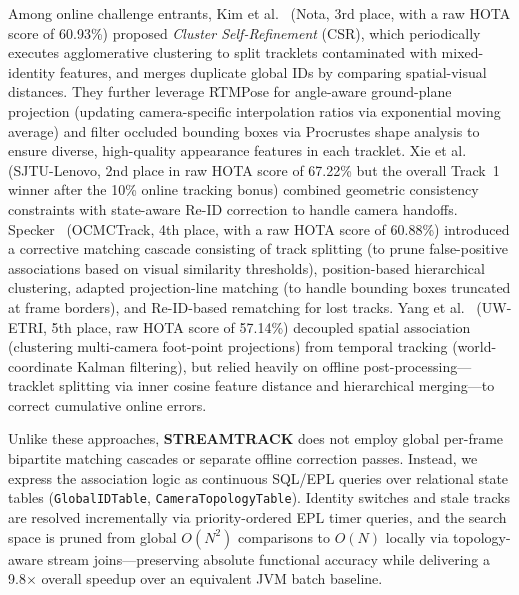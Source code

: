 \documentclass[review]{elsarticle}
\begin{document}
Among online challenge entrants, Kim et al.~\cite{kim2024cluster} (Nota, 3rd place, with a raw HOTA score of 60.93\%) proposed \emph{Cluster Self-Refinement} (CSR), which periodically executes agglomerative clustering to split tracklets contaminated with mixed-identity features, and merges duplicate global IDs by comparing spatial-visual distances. They further leverage RTMPose for angle-aware ground-plane projection (updating camera-specific interpolation ratios via exponential moving average) and filter occluded bounding boxes via Procrustes shape analysis to ensure diverse, high-quality appearance features in each tracklet. Xie et al.~\cite{xie2024robust} (SJTU-Lenovo, 2nd place in raw HOTA score of 67.22\% but the overall Track~1 winner after the 10\% online tracking bonus) combined geometric consistency constraints with state-aware Re-ID correction to handle camera handoffs. Specker~\cite{specker2024ocmctrack} (OCMCTrack, 4th place, with a raw HOTA score of 60.88\%) introduced a corrective matching cascade consisting of track splitting (to prune false-positive associations based on visual similarity thresholds), position-based hierarchical clustering, adapted projection-line matching (to handle bounding boxes truncated at frame borders), and Re-ID-based rematching for lost tracks. Yang et al.~\cite{yang2024online} (UW-ETRI, 5th place, raw HOTA score of 57.14\%) decoupled spatial association (clustering multi-camera foot-point projections) from temporal tracking (world-coordinate Kalman filtering), but relied heavily on offline post-processing---tracklet splitting via inner cosine feature distance and hierarchical merging---to correct cumulative online errors.

Unlike these approaches, \textbf{STREAMTRACK} does not employ global per-frame bipartite matching cascades or separate offline correction passes. Instead, we express the association logic as continuous SQL/EPL queries over relational state tables (\texttt{GlobalIDTable}, \texttt{CameraTopologyTable}). Identity switches and stale tracks are resolved incrementally via priority-ordered EPL timer queries, and the search space is pruned from global $O(N^2)$ comparisons to $O(N)$ locally via topology-aware stream joins---preserving absolute functional accuracy while delivering a 9.8$\times$ overall speedup over an equivalent JVM batch baseline.
\end{document}
